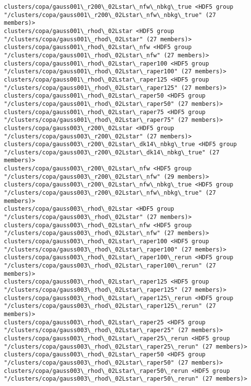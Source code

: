 \documentclass[11pt]{article}
\begin{document}
\begin{Verbatim}[commandchars=\\\{\}]
clusters/copa/gauss001\_r200\_02Lstar\_nfw\_nbkg\_true <HDF5 group "/clusters/copa/gauss001\_r200\_02Lstar\_nfw\_nbkg\_true" (27 members)>
clusters/copa/gauss001\_rhod\_02Lstar <HDF5 group "/clusters/copa/gauss001\_rhod\_02Lstar" (27 members)>
clusters/copa/gauss001\_rhod\_02Lstar\_nfw <HDF5 group "/clusters/copa/gauss001\_rhod\_02Lstar\_nfw" (27 members)>
clusters/copa/gauss001\_rhod\_02Lstar\_raper100 <HDF5 group "/clusters/copa/gauss001\_rhod\_02Lstar\_raper100" (27 members)>
clusters/copa/gauss001\_rhod\_02Lstar\_raper125 <HDF5 group "/clusters/copa/gauss001\_rhod\_02Lstar\_raper125" (27 members)>
clusters/copa/gauss001\_rhod\_02Lstar\_raper50 <HDF5 group "/clusters/copa/gauss001\_rhod\_02Lstar\_raper50" (27 members)>
clusters/copa/gauss001\_rhod\_02Lstar\_raper75 <HDF5 group "/clusters/copa/gauss001\_rhod\_02Lstar\_raper75" (27 members)>
clusters/copa/gauss003\_r200\_02Lstar <HDF5 group "/clusters/copa/gauss003\_r200\_02Lstar" (27 members)>
clusters/copa/gauss003\_r200\_02Lstar\_dk14\_nbkg\_true <HDF5 group "/clusters/copa/gauss003\_r200\_02Lstar\_dk14\_nbkg\_true" (27 members)>
clusters/copa/gauss003\_r200\_02Lstar\_nfw <HDF5 group "/clusters/copa/gauss003\_r200\_02Lstar\_nfw" (29 members)>
clusters/copa/gauss003\_r200\_02Lstar\_nfw\_nbkg\_true <HDF5 group "/clusters/copa/gauss003\_r200\_02Lstar\_nfw\_nbkg\_true" (27 members)>
clusters/copa/gauss003\_rhod\_02Lstar <HDF5 group "/clusters/copa/gauss003\_rhod\_02Lstar" (27 members)>
clusters/copa/gauss003\_rhod\_02Lstar\_nfw <HDF5 group "/clusters/copa/gauss003\_rhod\_02Lstar\_nfw" (27 members)>
clusters/copa/gauss003\_rhod\_02Lstar\_raper100 <HDF5 group "/clusters/copa/gauss003\_rhod\_02Lstar\_raper100" (27 members)>
clusters/copa/gauss003\_rhod\_02Lstar\_raper100\_rerun <HDF5 group "/clusters/copa/gauss003\_rhod\_02Lstar\_raper100\_rerun" (27 members)>
clusters/copa/gauss003\_rhod\_02Lstar\_raper125 <HDF5 group "/clusters/copa/gauss003\_rhod\_02Lstar\_raper125" (27 members)>
clusters/copa/gauss003\_rhod\_02Lstar\_raper125\_rerun <HDF5 group "/clusters/copa/gauss003\_rhod\_02Lstar\_raper125\_rerun" (27 members)>
clusters/copa/gauss003\_rhod\_02Lstar\_raper25 <HDF5 group "/clusters/copa/gauss003\_rhod\_02Lstar\_raper25" (27 members)>
clusters/copa/gauss003\_rhod\_02Lstar\_raper25\_rerun <HDF5 group "/clusters/copa/gauss003\_rhod\_02Lstar\_raper25\_rerun" (27 members)>
clusters/copa/gauss003\_rhod\_02Lstar\_raper50 <HDF5 group "/clusters/copa/gauss003\_rhod\_02Lstar\_raper50" (27 members)>
clusters/copa/gauss003\_rhod\_02Lstar\_raper50\_rerun <HDF5 group "/clusters/copa/gauss003\_rhod\_02Lstar\_raper50\_rerun" (27 members)>

\end{Verbatim}
\end{document}
